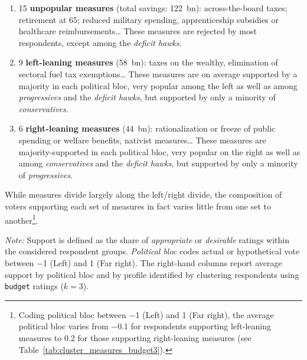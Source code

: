 \documentclass[12pt,english]{article}
\newcommand{\blue}[1]{\textcolor{blue!60!black}{#1}}
\begin{document}
\begin{enumerate}
  \item 15 \textbf{unpopular measures} (total savings: 122~bn): across-the-board taxes; retirement at 65; reduced military spending, apprenticeship subsidies or healthcare reimbursements\dots{} These measures are rejected by most respondents, except among the \textit{deficit hawks}.
  \item 9 \textbf{left-leaning measures} (58~bn): taxes on the wealthy, elimination of sectoral fuel tax exemptions\dots{} These measures are on average supported by a majority in each political bloc, very popular among the left as well as among \textit{progressives} and the \textit{deficit hawks}, but supported by only a minority of \textit{conservatives}.
  \item 6 \textbf{right-leaning measures} (44~bn): rationalization or freeze of public spending or welfare benefits, nativist measures\dots{} These measures are majority-supported in each political bloc, very popular on the right as well as among \textit{conservatives} and the \textit{deficit hawks}, but supported by only a minority of \textit{progressives}.
\end{enumerate}

\blue{While measures divide largely along the left/right divide,
the composition of voters supporting each set of measures in fact varies little from one set to another}\footnote{Coding political bloc between $-$1 (Left) and 1 (Far right), the average political bloc varies from $-$0.1 for respondents supporting left-leaning measures to 0.2 for those supporting right-leaning measures (see Table~\ref{tab:cluster_measures_budget3}).}.

\begin{table}[htbp]
  \centering\footnotesize\setlength{\tabcolsep}{4pt}\caption{Support for \texttt{budget} measure sets identified by clustering ($k$=3).}
  
  \par\smallskip
  {\footnotesize \textit{Note:} Support is defined as the share of \textit{appropriate} or \textit{desirable} ratings within the considered respondent groups. \textit{Political bloc} codes actual or hypothetical vote between $-$1 (Left) and 1 (Far right). The right-hand columns report average support by political bloc and by profile identified by clustering respondents using \texttt{budget} ratings ($k=3$).}
  \label{tab:cluster_measures_budget3}
\end{table}
\end{document}
